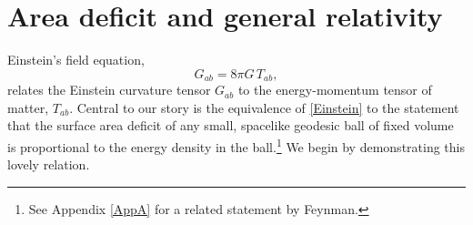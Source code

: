 \documentclass[aps,prd,twocolumn,showpacs,groupedaddress,nofootinbib,longbibliography]{revtex4-1}
\def\beq{\begin{equation}}
\def\eeq{\end{equation}}
\begin{document}

\section{Area deficit and general relativity}

Einstein's field equation, 
%
\beq\label{Einstein}
G_{ab} = 8\pi G\, T_{ab},
\eeq
%
relates the Einstein curvature tensor $G_{ab}$ to the energy-momentum tensor of matter, $T_{ab}$.
Central to our story is the equivalence of \eqref{Einstein} to 
the statement that the surface area deficit of any small, spacelike geodesic ball of fixed volume 
is proportional to the energy density in the ball.\footnote{See Appendix \ref{AppA} for a related statement by Feynman.}
We begin by demonstrating this lovely relation. 
\end{document}

